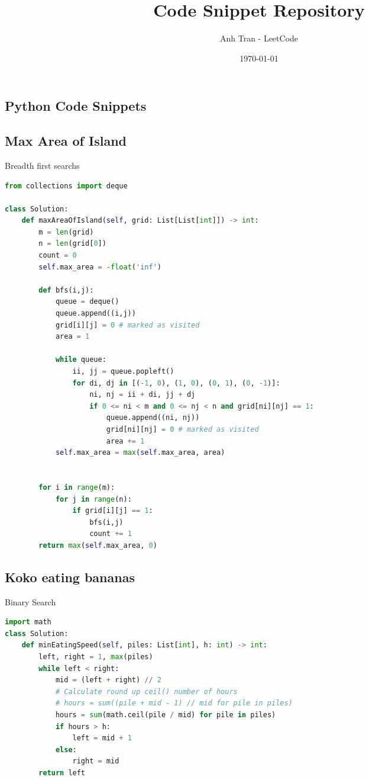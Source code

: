 \documentclass[a4paper,12pt]{article}
\title{Code Snippet Repository}
\author{Anh Tran - LeetCode}
\date{\today}
\begin{document}
\maketitle

\begin{multicols}{2}

\section{Python Code Snippets}

\subsection{Max Area of Island}
\begin{mycode}[label={lst:max-area-of-island}]{Breadth first searchs}
\begin{lstlisting}[language=Python]
from collections import deque

class Solution:
    def maxAreaOfIsland(self, grid: List[List[int]]) -> int:
        m = len(grid)
        n = len(grid[0])
        count = 0
        self.max_area = -float('inf')

        def bfs(i,j):
            queue = deque()
            queue.append((i,j))
            grid[i][j] = 0 # marked as visited
            area = 1

            while queue:
                ii, jj = queue.popleft()
                for di, dj in [(-1, 0), (1, 0), (0, 1), (0, -1)]:
                    ni, nj = ii + di, jj + dj
                    if 0 <= ni < m and 0 <= nj < n and grid[ni][nj] == 1:
                        queue.append((ni, nj))
                        grid[ni][nj] = 0 # marked as visited
                        area += 1
            self.max_area = max(self.max_area, area)

        
        for i in range(m):
            for j in range(n):
                if grid[i][j] == 1:
                    bfs(i,j)
                    count += 1
        return max(self.max_area, 0)
\end{lstlisting}
\end{mycode}

\subsection{Koko eating bananas}
\begin{mycode}[label={lst:koko-eating-bananas}]{Binary Search}
\begin{lstlisting}[language=Python]
import math
class Solution:
    def minEatingSpeed(self, piles: List[int], h: int) -> int:
        left, right = 1, max(piles)
        while left < right:
            mid = (left + right) // 2
            # Calculate round up ceil() number of hours
            # hours = sum((pile + mid - 1) // mid for pile in piles)
            hours = sum(math.ceil(pile / mid) for pile in piles)
            if hours > h:
                left = mid + 1
            else:
                right = mid
        return left
\end{lstlisting}
\end{mycode}


\end{multicols}
\end{document}
